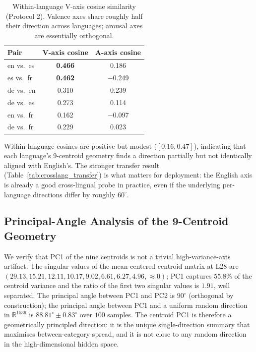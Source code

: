 \begin{table}[h]
\centering
\caption{Within-language V-axis cosine similarity (Protocol 2).
Valence axes share roughly half their direction across languages; arousal
axes are essentially orthogonal.}
\label{tab:crosslang}
\begin{tabular}{lcc}
\toprule
Pair & V-axis cosine & A-axis cosine \\
\midrule
en vs.\ es & \textbf{0.466} & 0.186 \\
es vs.\ fr & \textbf{0.462} & $-$0.249 \\
de vs.\ en & 0.310 & 0.239 \\
de vs.\ es & 0.273 & 0.114 \\
en vs.\ fr & 0.162 & $-$0.097 \\
de vs.\ fr & 0.229 & 0.023 \\
\bottomrule
\end{tabular}
\end{table}

Within-language cosines are positive but modest ($[0.16, 0.47]$), indicating
that each language's 9-centroid geometry finds a direction partially but
not identically aligned with English's. The stronger transfer result
(Table~\ref{tab:crosslang_transfer}) is what matters for deployment: the
English axis is already a good cross-lingual probe in practice, even if
the underlying per-language directions differ by roughly $60^\circ$.

\subsection{Principal-Angle Analysis of the 9-Centroid Geometry}
\label{sec:principal_angle}

We verify that PC1 of the nine centroids is not a trivial
high-variance-axis artifact. The singular values of the mean-centered
centroid matrix at L28 are $(29.13, 15.21, 12.11, 10.17, 9.02, 6.61,
6.27, 4.96, \approx 0)$; PC1 captures $55.8\%$ of the centroid variance
and the ratio of the first two singular values is $1.91$, well separated.
The principal angle between PC1 and PC2 is $90^\circ$ (orthogonal by
construction); the principal angle between PC1 and a uniform random
direction in $\mathbb{R}^{1536}$ is $88.81^\circ \pm 0.83^\circ$ over
$100$ samples. The centroid PC1 is therefore a geometrically principled
direction: it is the unique single-direction summary that maximises
between-category spread, and it is not close to any random direction in
the high-dimensional hidden space.

